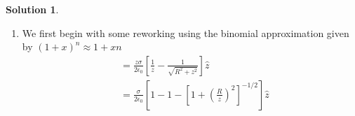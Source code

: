 \documentclass[10pt]{article}
\theoremstyle{definition}
\newtheorem{soln}{Solution}
\newcommand{\uz}{\hat{z}}
\newcommand{\primed}[1]{#1^\prime}
\begin{document}
\begin{soln}
\begin{enumerate}[label=(\alph*)]
\begin{align*}
             & = \frac{\sigma}{4\pi\epsilon_0}\int_0^{2\pi}\int_0^R\frac{(-r\cos\theta,-r\sin\theta,z)}{\left({\primed{r}}^2+z^2\right)^{3/2}}\primed{r}d\primed{r}d\theta \quad \text{Integrating w.r.t \theta\,kills the sin and cos by symmetry} \\
             & = \frac{\sigma}{4\pi\epsilon_0}\int_{0=\primed{r}}^R\frac{(0,0,2\pi z)}{2u^{3/2}}du\rightsquigarrow u={\primed{r}}^2+z^2\implies du/2\primed{r}=d\primed{r}                                                                          \\
             & = \frac{\sigma}{4\epsilon_0}\int_{0=\primed{r}}^R\frac{(0,0,z)}{u^{3/2}}du                                                                                                                                                           \\
             & = -\frac{z\sigma}{2\epsilon_0}{\left[\left({\primed{r}}^2+z^2\right)^{-1/2}\right]}_{0}^{R}\uz=\frac{z\sigma}{2\epsilon_0}\left[\frac{1}{\abs{z}}-\frac{1}{\sqrt{R^2+z^2}}\right]\uz                                                 \\
          \end{align*}
          For boundary conditions 
          \begin{align*}
            \mathbf{E}_{above}-\mathbf{E}_{below} & = \frac{z\sigma}{2\epsilon_0}\left[\frac{1}{z}-\frac{1}{\sqrt{R^2+z^2}}+\frac{1}{z}+\frac{1}{\sqrt{R^2+z^2}}\right]\uz \\
                                                  & = \frac{z\sigma}{2\epsilon_0}\left[\frac{2}{z}\right]\uz                                                               \\
                                                  & = \frac{\sigma}{\epsilon_0}\uz                                                                                         \\
          \end{align*}
          Which satisfies equation 2.33 as $\uz$ here is our normal vector.
    \item We first begin with some reworking using the binomial approximation given by $(1+x)^n\approx 1+xn$
          \begin{align*}
             & =\frac{z\sigma}{2\epsilon_0}\left[\frac{1}{z}-\frac{1}{\sqrt{R^2+z^2}}\right]\uz                \\
             & =\frac{\sigma}{2\epsilon_0}\left[1-1-\left[1+\left(\frac{R}{z}\right)^2\right]^{-1/2}\right]\uz \\

\end{align*}
\end{enumerate}
\end{soln}
\end{document}
